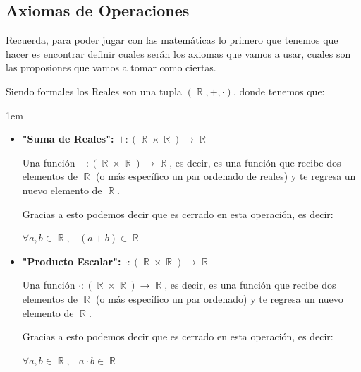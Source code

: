 \documentclass[12pt, fleqn]{report}                             %
\newenvironment{SmallIndentation}[1][0.75em]                    %
        {\begin{adjustwidth}{#1}{}\begin{footnotesize}}             %
        {\end{footnotesize}\end{adjustwidth}}                       %
\DeclareMathOperator \Space     {\quad}                         %
\DeclareMathOperator \MiniSpace {\;}                            %
\theoremstyle{break}                                            %
\DeclareMathOperator \Reals        {\mathbb{R}}                 %
\begin{document}
            \subsection{Axiomas de Operaciones}

                Recuerda, para poder jugar con las matemáticas lo primero que tenemos que hacer
                es encontrar definir cuales serán los axiomas que vamos a usar, cuales son las
                proposiones que vamos a tomar como ciertas.

                Siendo formales los Reales son una tupla $(\Reals, +, \cdot)$, donde tenemos que:
                
                \begin{SmallIndentation}[1em]
                    
                    \begin{itemize}
                        \item
                            \textbf{"Suma de Reales": $+: (\Reals \times  \Reals) \to \Reals$}

                            Una función $+: (\Reals \times  \Reals) \to \Reals$, es decir, es una función
                            que recibe dos elementos de $\Reals$ (o más específico un par ordenado de reales) y te
                            regresa un nuevo elemento de $\Reals$.

                            Gracias a esto podemos decir que es cerrado en esta operación, es decir:

                            $\forall a, b \in \Reals, \MiniSpace (a + b) \in \Reals$  

                        \item
                            \textbf{"Producto Escalar": $\cdot: (\Reals \times  \Reals) \to \Reals$}

                            Una función $\cdot: (\Reals \times  \Reals) \to \Reals$, es decir, es una función
                            que recibe dos elementos de $\Reals$
                            (o más específico un par ordenado) y te regresa un nuevo elemento de $\Reals$.

                            Gracias a esto podemos decir que es cerrado en esta operación, es decir:

                            $\forall a, b \in \Reals, \MiniSpace a \cdot b \in \Reals$  

                    \end{itemize}
                
                \end{SmallIndentation}
\end{document}
